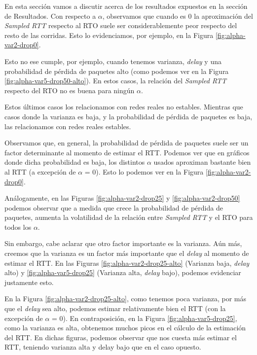 En esta sección vamos a discutir acerca de los resultados expuestos en la sección de Resultados.
%
Con respecto a $\alpha$, observamos que cuando es 0 la aproximación del \emph{Sampled RTT} respecto al RTO suele ser considerablemente peor respecto del resto de las corridas. Esto lo evidenciamos, por ejemplo, en la Figura \ref{fig:alpha-var2-drop0}.

Esto no ese cumple, por ejemplo, cuando tenemos varianza, \emph{delay} y una probabilidad de pérdida de paquetes alto (como podemos ver en la Figura \ref{fig:alpha-var5-drop50-alto}). En estos casos, la relación del \emph{Sampled RTT} respecto del RTO no es buena para ningún $\alpha$.

Estos últimos casos los relacionamos con redes reales no estables. Mientras que casos donde la varianza es baja, y la probabilidad de pérdida de paquetes es baja, las relacionamos con redes reales estables.

Observamos que, en general, la probabilidad de pérdida de paquetes suele ser un factor determinante al momento de estimar el RTT. Podemos ver que en gráficos donde dicha probabilidad es baja, los distintos $\alpha$ usados aproximan bastante bien al RTT (a excepción de $\alpha$ = 0). Esto lo podemos ver en la Figura \ref{fig:alpha-var2-drop0}.

Análogamente, en las Figuras \ref{fig:alpha-var2-drop25} y \ref{fig:alpha-var2-drop50} podemos observar que a medida que crece la probabilidad de pérdida de paquetes, aumenta la volatilidad de la relación entre \emph{Sampled RTT} y el RTO para todos los $\alpha$.

Sin embargo, cabe aclarar que otro factor importante es la varianza. Aún más, creemos que la varianza es un factor más importante que el \emph{delay} al momento de estimar el RTT. En las Figuras \ref{fig:alpha-var2-drop25-alto} (Varianza baja, \emph{delay} alto) y \ref{fig:alpha-var5-drop25} (Varianza alta, \emph{delay} bajo), podemos evidenciar justamente esto.

En la Figura \ref{fig:alpha-var2-drop25-alto}, como tenemos poca varianza, por más que el \emph{delay} sea alto, podemos estimar relativamente bien el RTT (con la excepción de $\alpha$ = 0). En contraposición, en la Figura \ref{fig:alpha-var5-drop25}, como la varianza es alta, obtenemos muchos picos en el cálculo de la estimación del RTT. En dichas figuras, podemos observar que nos cuesta más estimar el RTT, teniendo varianza alta y delay bajo que en el caso opuesto.

